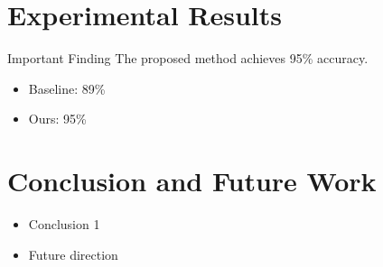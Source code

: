 \documentclass[a4paper, 12pt]{article}
\begin{document}


\newpage

\section{Experimental Results}

\begin{alertbox}{Important Finding}
  The proposed method achieves 95\% accuracy.
\end{alertbox}


\begin{itemize}
  \item Baseline: 89\%
  \item Ours: 95\%
\end{itemize}

\newpage

\section{Conclusion and Future Work}

\begin{itemize}
  \item Conclusion 1
  \item Future direction
\end{itemize}

\qa
\thankspage
\end{document}
